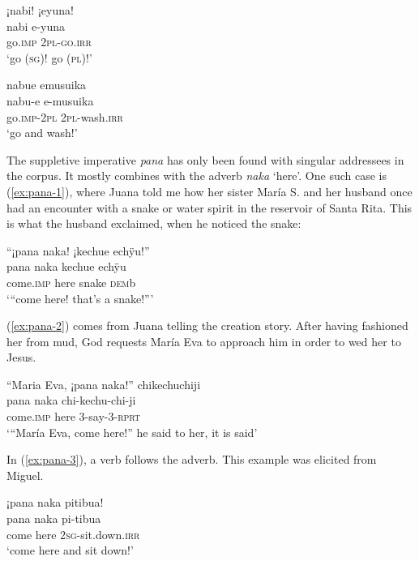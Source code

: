\ea\label{ex:nabi-7}
\begingl
\glpreamble ¡nabi! ¡eyuna!\\
\gla nabi e-yuna\\
\glb go.\textsc{imp} 2\textsc{pl-go.\textsc{irr}}\\
\glft ‘go (\textsc{sg})! go (\textsc{pl})!’
\endgl
\trailingcitation{[mqx-p110826l.031]}
\xe

\ea\label{ex:nabi-6}
\begingl
\glpreamble nabue emusuika\\
\gla nabu-e e-musuika\\
\glb go.\textsc{imp}-2\textsc{pl} 2\textsc{pl}-wash.\textsc{irr}\\
\glft ‘go and wash!’
\endgl
\trailingcitation{[jxx-e081025s-1.535]}
\xe

The suppletive imperative \textit{pana} has only been found with singular addressees in the corpus. It mostly combines with the adverb \textit{naka} ‘here’. One such case is (\ref{ex:pana-1}), where Juana told me how her sister María S. and her husband once had an encounter with a snake or water spirit in the reservoir of Santa Rita. This is what the husband exclaimed, when he noticed the snake:

\ea\label{ex:pana-1}
\begingl
\glpreamble “¡pana naka! ¡kechue echÿu!”\\
\gla pana naka kechue echÿu\\
\glb come.\textsc{imp} here snake \textsc{dem}b\\
\glft ‘“come here! that’s a snake!”’
\endgl
\trailingcitation{[jxx-p120515l-2.164]}
\xe

(\ref{ex:pana-2}) comes from Juana telling the creation story. After having fashioned her from mud, God requests María Eva to approach him in order to wed her to Jesus.

\ea\label{ex:pana-2}
\begingl
\glpreamble “Maria Eva, ¡pana naka!” chikechuchiji\\
 pana naka chi-kechu-chi-ji\\
 come.\textsc{imp} here 3-say-3-\textsc{rprt}\\
\glft ‘“María Eva, come here!” he said to her, it is said’
\endgl
\trailingcitation{[jxx-n101013s-1.364]}
\xe

In (\ref{ex:pana-3}), a verb follows the adverb. This example was elicited from Miguel.

\ea\label{ex:pana-3}
\begingl
\glpreamble ¡pana naka pitibua!\\
\gla pana naka pi-tibua\\
\glb come here 2\textsc{sg}-sit.down.\textsc{irr}\\
\glft ‘come here and sit down!’
\endgl
\trailingcitation{[mxx-e160811sd.221]}
\xe


